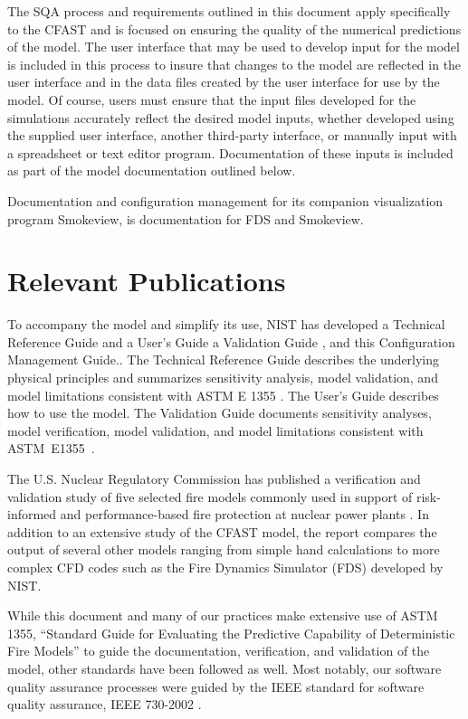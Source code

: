 \documentclass[12pt]{book}
\begin{document}
The SQA process and requirements outlined in this document apply specifically to the CFAST and is focused on ensuring the quality of the numerical predictions of the model.  The user interface that may be used to develop input for the model is included in this process to insure that changes to the model are reflected in the user interface and in the data files created by the user interface for use by the model.  Of course, users must ensure that the input files developed for the simulations accurately reflect the desired model inputs, whether developed using the supplied user interface, another third-party interface, or manually input with a spreadsheet or text editor program.  Documentation of these inputs is included as part of the model documentation outlined below.

Documentation and configuration management for its companion visualization program Smokeview, is documentation for FDS and Smokeview.

\chapter{Relevant Publications}

To accompany the model and simplify its use, NIST has developed a Technical Reference Guide \cite{CFAST_Tech_Guide_7} and a User's Guide \cite{CFAST_Users_Guide_7} a Validation Guide \cite{CFAST_Valid_Guide_7}, and this Configuration Management Guide..  The Technical Reference Guide describes the underlying physical principles and summarizes sensitivity analysis, model validation, and model limitations consistent with ASTM E 1355 \cite{ASTM:E1355}.  The User's Guide describes how to use the model.  The Validation Guide documents sensitivity analyses, model verification, model validation, and model limitations consistent with ASTM~E1355~\cite{ASTM:E1355}.

The U.S. Nuclear Regulatory Commission has published a verification and validation study of five selected fire models commonly used in support of risk-informed and performance-based fire protection at nuclear power plants \cite{NRCNUREG1824}. In addition to an extensive study of the CFAST model, the report compares the output of several other models ranging from simple hand calculations to more complex CFD codes such as the Fire Dynamics Simulator (FDS) developed by NIST.

While this document and many of our practices make extensive use of ASTM 1355, ``Standard Guide for Evaluating the Predictive Capability of Deterministic Fire Models'' \cite{ASTM:E1355} to guide the documentation, verification, and validation of the model, other standards have been followed as well.  Most notably, our software quality assurance processes were guided by the IEEE standard for software quality assurance, IEEE 730-2002 \cite{IEEE:730}.
\end{document}
